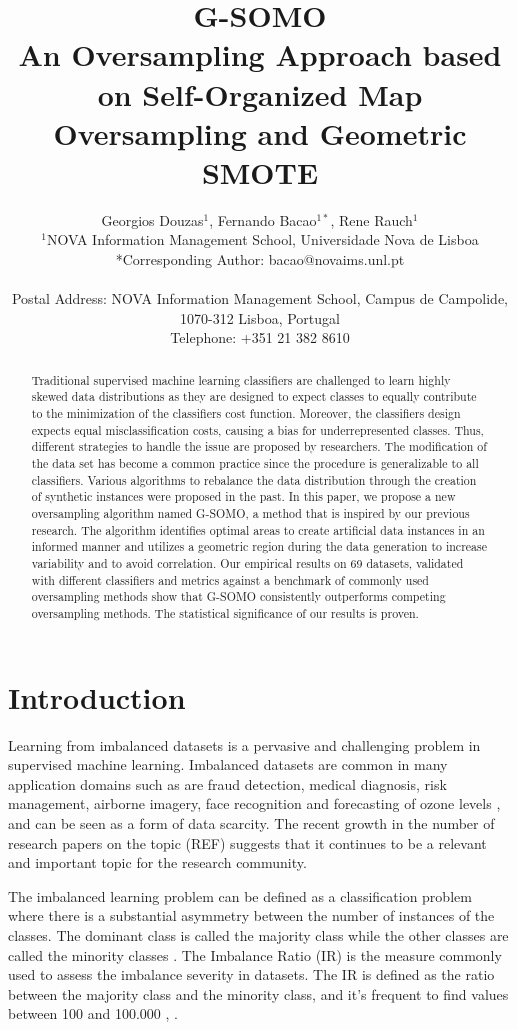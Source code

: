 \documentclass[parskip=full]{scrartcl}
\title{G-SOMO \\ \LARGE{An Oversampling Approach based on Self-Organized Map Oversampling and Geometric SMOTE}}
\author{
	Georgios Douzas\(^{1}\), Fernando Bacao\(^{1*}\), Rene Rauch\(^{1}\)
	\\
	\small{\(^{1}\)NOVA Information Management School, Universidade Nova de Lisboa}
	\\
	\small{*Corresponding Author: bacao@novaims.unl.pt}
	\\
	\\
	\small{Postal Address: NOVA Information Management School, Campus de Campolide, 1070-312 Lisboa, Portugal}
	\\
	\small{Telephone: +351 21 382 8610}
}
\date{}
\begin{document}
\maketitle

\begin{abstract}
Traditional supervised machine learning classifiers are challenged to learn
highly skewed data distributions as they are designed to expect classes to
equally contribute to the minimization of the classifiers cost function.
Moreover, the classifiers design expects equal misclassification costs, causing
a bias for underrepresented classes. Thus, different strategies to handle the
issue are proposed by researchers. The modification of the data set has become a
common practice since the procedure is generalizable to all classifiers. Various
algorithms to rebalance the data distribution through the creation of synthetic
instances were proposed in the past.  In this paper, we propose a new
oversampling algorithm named G-SOMO, a method that is inspired by our previous
research. The algorithm identifies optimal areas to create artificial data
instances in an informed manner and utilizes a geometric region during the data
generation to increase variability and to avoid correlation. Our empirical
results on 69 datasets, validated with different classifiers and metrics against
a benchmark of commonly used oversampling methods show that G-SOMO consistently
outperforms competing oversampling methods. The statistical significance of our
results is proven. 
\end{abstract}

\section{Introduction}

Learning from imbalanced datasets is a pervasive and challenging problem in
supervised machine learning. Imbalanced datasets are common in many application
domains such as are fraud detection, medical diagnosis, risk management,
airborne imagery, face recognition and forecasting of ozone levels
\cite{Akbani2004}, and can be seen as a form of data scarcity. The recent growth
in the number of research papers on the topic (REF) suggests that it continues
to be a relevant and important topic for the research community.

The imbalanced learning problem can be defined as a classification problem where
there is a substantial asymmetry between the number of instances of the classes.
The dominant class is called the majority class while the other classes are
called the minority classes \cite{Chawla2003}. The Imbalance Ratio (IR) is the
measure commonly used to assess the imbalance severity in datasets. The IR is
defined as the ratio between the majority class and the minority class, and it’s
frequent to find values between 100 and 100.000 \cite{Chawla2002},
\cite{Barua2014}.
\end{document}
